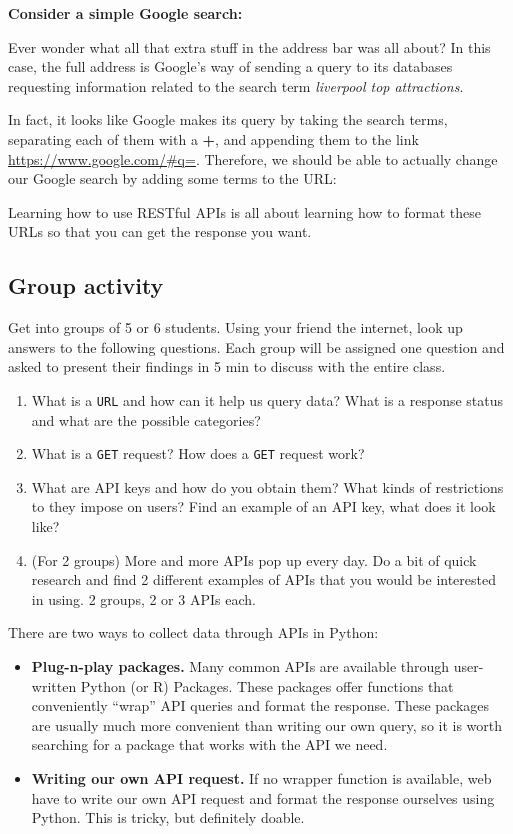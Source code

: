 \documentclass[
  letterpaper,
  DIV=11,
  numbers=noendperiod]{scrreprt}
\providecommand{\tightlist}{%
  \setlength{\itemsep}{0pt}\setlength{\parskip}{0pt}}\usepackage{longtable,booktabs,array}
\begin{document}
\textbf{Consider a simple Google search:}

Ever wonder what all that extra stuff in the address bar was all about?
In this case, the full address is Google's way of sending a query to its
databases requesting information related to the search term
\emph{liverpool top attractions}.

In fact, it looks like Google makes its query by taking the search
terms, separating each of them with a \textbf{+}, and appending them to
the link \url{https://www.google.com/\#q=}. Therefore, we should be able
to actually change our Google search by adding some terms to the URL:

Learning how to use RESTful APIs is all about learning how to format
these URLs so that you can get the response you want.

\hypertarget{group-activity}{%
\subsection{Group activity}\label{group-activity}}

Get into groups of 5 or 6 students. Using your friend the internet, look
up answers to the following questions. Each group will be assigned one
question and asked to present their findings in 5 min to discuss with
the entire class.

\begin{enumerate}
\def\labelenumi{\arabic{enumi}.}
\tightlist
\item
  What is a \texttt{URL} and how can it help us query data? What is a
  response status and what are the possible categories?
\item
  What is a \texttt{GET} request? How does a \texttt{GET} request work?
\item
  What are API keys and how do you obtain them? What kinds of
  restrictions to they impose on users? Find an example of an API key,
  what does it look like?
\item
  (For 2 groups) More and more APIs pop up every day. Do a bit of quick
  research and find 2 different examples of APIs that you would be
  interested in using. 2 groups, 2 or 3 APIs each.
\end{enumerate}

There are two ways to collect data through APIs in Python:

\begin{itemize}
\tightlist
\item
  \textbf{Plug-n-play packages.} Many common APIs are available through
  user-written Python (or R) Packages. These packages offer functions
  that conveniently ``wrap'' API queries and format the response. These
  packages are usually much more convenient than writing our own query,
  so it is worth searching for a package that works with the API we
  need.
\item
  \textbf{Writing our own API request.} If no wrapper function is
  available, web have to write our own API request and format the
  response ourselves using Python. This is tricky, but definitely
  doable.
\end{itemize}
\end{document}
